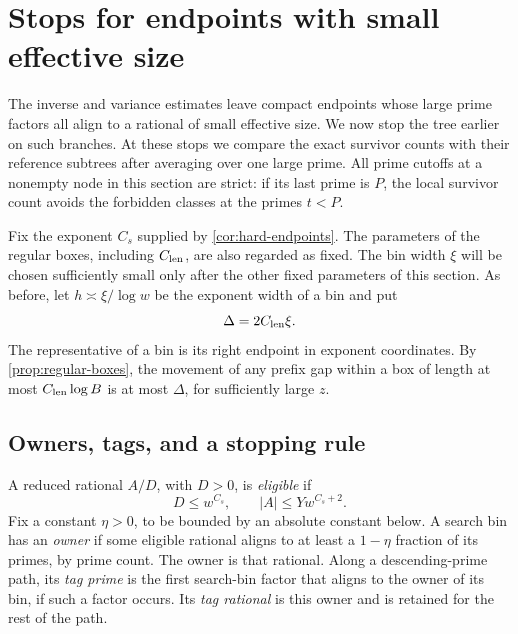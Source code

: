 \section{Stops for endpoints with small effective size}
\label{sec:stops}

The inverse and variance estimates leave compact endpoints whose large
prime factors all align to a rational of small effective size.  We now
stop the tree earlier on such branches.  At these stops we compare the
exact survivor counts with their reference subtrees after averaging over
one large prime.  All prime cutoffs at a nonempty node in this section
are strict: if its last prime is $P$, the local survivor count avoids
the forbidden classes at the primes $t<P$.

Fix the exponent $C_s$ supplied by \cref{cor:hard-endpoints}.  The
parameters of the regular boxes, including $C_{\rm len}$, are also
regarded as fixed.  The bin width $\xi$ will be chosen sufficiently small
only after the other fixed parameters of this section.  As before, let
$h\asymp\xi/\log w$ be the exponent width of a bin and put
\[
 \Delta=2C_{\rm len}\xi.
\]
The representative of a bin is its right endpoint in exponent
coordinates.  By \cref{prop:regular-boxes}, the movement of any prefix
gap within a box of length at most $C_{\rm len}\log B$ is at most
$\Delta$, for sufficiently large $z$.

\subsection{Owners, tags, and a stopping rule}

\begin{definition}\label{def:stops-owner}
A reduced rational $A/D$, with $D>0$, is \emph{eligible} if
\begin{equation}\label{eq:stops-eligible}
 D\le w^{C_s},\qquad |A|\le Yw^{C_s+2}.
\end{equation}
Fix a constant $\eta>0$, to be bounded by an absolute constant below.
A search bin has an \emph{owner} if some eligible rational aligns to
at least a $1-\eta$ fraction of its primes, by prime count.  The owner
is that rational.  Along a descending-prime path, its \emph{tag prime}
is the first search-bin factor that aligns to the owner of its bin,
if such a factor occurs.  Its \emph{tag rational} is this owner and
is retained for the rest of the path.
\end{definition}

